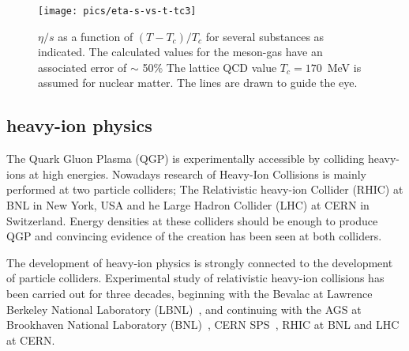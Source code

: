 \begin{figure}[htb]
\centering
\texttt{[image: pics/eta-s-vs-t-tc3]}
\caption[$\eta/s$ vs $(T-T_c)/T_c$]{\label{fig3}$\eta/s$ as a function of $(T-T_c)/T_c$ for several substances as indicated.
	The calculated values for the meson-gas have an associated error 
	of $\sim$ 50\% %
	The lattice QCD value $T_c = 170$~MeV %
	is assumed for nuclear matter. The lines are drawn to guide the eye.~\cite{PhysRevLett.98.092301}
}
\label{fig:etas}
\end{figure}



\FloatBarrier
\pagebreak
\subsection{heavy-ion physics}
The Quark Gluon Plasma (QGP) is experimentally accessible by colliding heavy-ions at high energies. Nowadays research of Heavy-Ion Collisions is mainly performed at two particle colliders; The Relativistic heavy-ion Collider (RHIC) at BNL in New York, USA and he Large Hadron Collider (LHC) at CERN in Switzerland. Energy densities at these colliders should be enough to produce QGP and convincing evidence of the creation has been seen at both colliders.

The development of heavy-ion physics is strongly connected to the development of particle colliders. Experimental study of relativistic heavy-ion collisions has been carried out for three decades, beginning with the Bevalac at Lawrence Berkeley National Laboratory (LBNL)~\cite{Lofgren_1975}, and continuing with the AGS at Brookhaven National Laboratory (BNL)~\cite{Barton:1987}, CERN SPS~\cite{Vitev:2002pf}, RHIC at BNL and LHC at CERN. 

%


